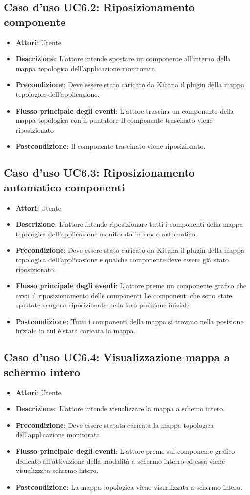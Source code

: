 \subsection{Caso d'uso UC6.2: Riposizionamento componente}
\begin{itemize}
\item \textbf{Attori}: Utente
\item \textbf{Descrizione}: L'attore intende spostare un componente all'interno della mappa topologica dell'applicazione monitorata.
\item \textbf{Precondizione}: Deve essere stato caricato da Kibana il plugin della mappa topologica dell'applicazione.
\item \textbf{Flusso principale degli eventi}: L'attore trascina un componente della mappa topologica con il puntatore
Il componente trascinato viene riposizionato
\item \textbf{Postcondizione}: Il componente trascinato viene riposizionato.
\end{itemize}
\subsection{Caso d'uso UC6.3: Riposizionamento automatico componenti}
\begin{itemize}
\item \textbf{Attori}: Utente
\item \textbf{Descrizione}: L'attore intende riposizionare tutti i componenti della mappa topologica dell'applicazione monitorata in modo automatico.
\item \textbf{Precondizione}: Deve essere stato caricato da Kibana il plugin della mappa topologica dell'applicazione e qualche componente deve essere già stato riposizionato.
\item \textbf{Flusso principale degli eventi}: L'attore preme un  componente grafico che avvii il riposizionamento delle componenti 
Le componenti che sono state spostate vengono riposizionate nella loro posizione iniziale
\item \textbf{Postcondizione}: Tutti i componenti della mappa si trovano nella posizione iniziale in cui è stata caricata la mappa. 
\end{itemize}
\subsection{Caso d'uso UC6.4: Visualizzazione mappa a schermo intero}
\begin{itemize}
\item \textbf{Attori}: Utente
\item \textbf{Descrizione}: L'attore intende visualizzare la mappa a schemo intero.
\item \textbf{Precondizione}: Deve essere statata caricata la mappa topologica dell'applicazione monitorata.
\item \textbf{Flusso principale degli eventi}: L'attore preme sul componente grafico dedicato all'attivazione della modalità a schermo interro ed essa viene visualizzata  schermo intero.
\item \textbf{Postcondizione}: La mappa topologica viene visualizzata a schermo intero.
\end{itemize}
